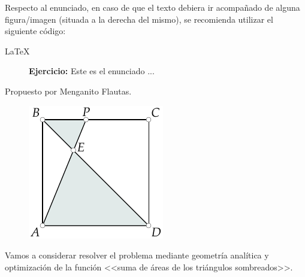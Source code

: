 \documentclass[
	fecha={5 de agosto de 2025},
	palabrasclave={RetoSecundaria, ago2025, álgebra, dif1},
	codigo=minted
]{RetoMatematico}
\begin{document}
\maketitle
\thispagestyle{empty}


Respecto al enunciado, en caso de que el texto debiera ir acompañado de alguna figura/imagen (situada a la derecha del mismo), se recomienda utilizar el siguiente código:
\begin{codigo}{LaTeX}
\begin{cajaejercicio}
	\begin{figure}
		\textbf{Ejercicio:} Este es el enunciado ...
	\end{figure}		
\end{cajaejercicio}

{\sf\color{verdeodi}Propuesto por Menganito Flautas.}
\end{codigo}


\forma

\begin{figure}
	\vspace{-4.5mm}
	\centering
	\includegraphics[scale=1]{imagenes/ejemplo-pstricks.pdf}
	\caption{}\label{fig:jmsm1}	
\end{figure}
Vamos a considerar resolver el problema mediante geometría analítica y optimización de la función <<suma de áreas de los triángulos sombreados>>.
\end{document}
